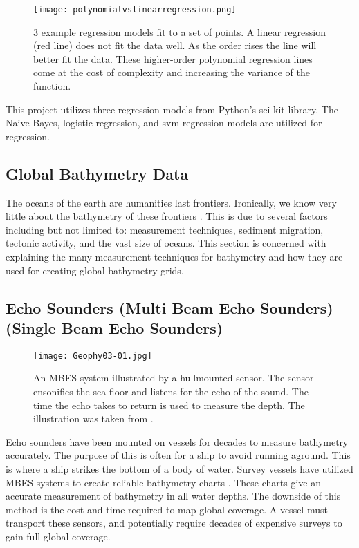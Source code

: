\begin{figure}[htp]
    \centering
    \texttt{[image: polynomialvslinearregression.png]}
    \caption[Figure depicting a regression model]{3 example regression models fit to a set of points.
    A linear regression (red line) does not fit the data well.
    As the order rises the line will better fit the data.
    These higher-order polynomial regression lines come at the cost of complexity and increasing the variance of the function.}
    \label{fig:repressionexample}
\end{figure} 

\medskip


This project utilizes three regression models from Python's sci-kit library.
The Naive Bayes\cite{sklearn_api}, logistic regression\cite{sklearn_api}, and svm regression\cite{sklearn_api} models are utilized for regression.

\subsection{Global Bathymetry Data}
The oceans of the earth are humanities last frontiers.
Ironically, we know very little about the bathymetry of these frontiers \cite{becker2009global}.
This is due to several factors including but not limited to: measurement techniques, sediment migration, tectonic activity, and the vast size of oceans.
This section is concerned with explaining the many measurement techniques for bathymetry and how they are used for creating global bathymetry grids.

\subsection{Echo Sounders (Multi Beam Echo Sounders)(Single Beam Echo Sounders) }

\begin{figure}[htp]
    \centering
    \texttt{[image: Geophy03-01.jpg]}
    \caption[Figure depicting a Multi-Beam Echo Sounder]{An \ac{MBES} system illustrated by a hull\-mounted sensor.
    The sensor ensonifies the sea floor and listens for the echo of the sound.
    The time the echo takes to return is used to measure the depth. 
    The illustration was taken from \cite{monacoWeb}.}
    \label{fig:MBES}
\end{figure}

Echo sounders have been mounted on vessels for decades to measure bathymetry accurately.
The purpose of this is often for a ship to avoid running aground.
This is where a ship strikes the bottom of a body of water.
Survey vessels have utilized \ac{MBES} systems to create reliable bathymetry charts \cite{farr1980multibeam}.
These charts give an accurate measurement of bathymetry in all water depths.
The downside of this method is the cost and time required to map global coverage.
A vessel must transport these sensors, and potentially require decades of expensive surveys to gain full global coverage.

